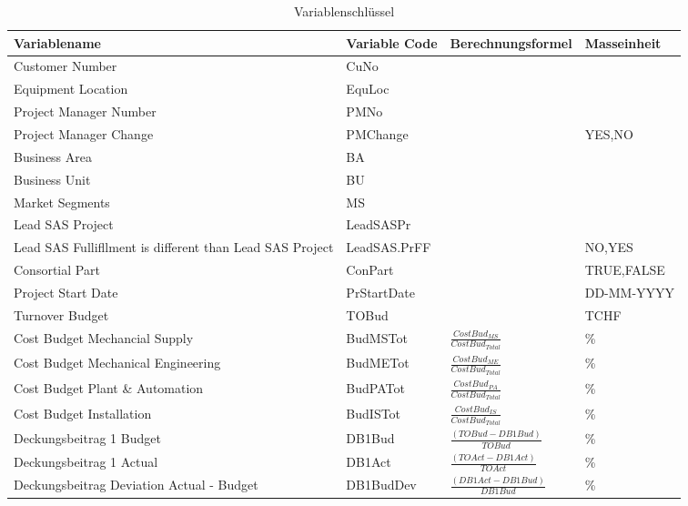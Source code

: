 \newpage\begin{landscape}
\begin{center}
\begin{longtable}{p{6cm}|p{4cm}|p{6cm}|p{3cm}}
	\caption{Variablenschlüssel}\\\hline
	\textbf{Variablename} & \textbf{Variable Code} & {\textbf{Berechnungsformel}} & {\textbf{Masseinheit}} \\\hline\endhead
		Customer Number & CuNo  &       &  \\
		Equipment Location & EquLoc &       &  \\
		Project Manager Number & PMNo  &       &  \\
		Project Manager Change & PMChange &       & \multicolumn{1}{l}{{YES,NO}} \\
		Business Area & BA    &       &  \\
		Business Unit & BU    &       &  \\
		Market Segments & MS    &       &  \\
		Lead SAS Project & LeadSASPr &       &  \\
		Lead SAS Fullifllment is different than Lead SAS Project & LeadSAS.PrFF &       & \multicolumn{1}{l}{{NO,YES}} \\
		Consortial Part & ConPart &       & \multicolumn{1}{l}{{TRUE,FALSE}} \\
		Project Start Date & PrStartDate &       & \multicolumn{1}{l}{DD-MM-YYYY} \\
		Turnover Budget & TOBud &       & \multicolumn{1}{l}{TCHF} \\
		Cost Budget Mechancial Supply & BudMSTot & $\frac{Cost Bud_{MS}}{Cost Bud_{Total}}$ & \multicolumn{1}{l}{\%} \\ [3mm]
		Cost Budget Mechanical Engineering & BudMETot & $\frac{Cost Bud_{ME}}{Cost Bud_{Total}}$ & \multicolumn{1}{l}{\%} \\ [3mm]
		Cost Budget Plant \& Automation & BudPATot & $\frac{Cost Bud_{PA}}{Cost Bud_{Total}}$ & \multicolumn{1}{l}{\%} \\ [3mm]
		Cost Budget Installation  & BudISTot & $\frac{Cost Bud_{IS}}{Cost Bud_{Total}}$ & \multicolumn{1}{l}{\%} \\ [3mm]
		Deckungsbeitrag 1 Budget & DB1Bud &  $\frac{(TOBud - DB1Bud)}{TOBud}$ & \multicolumn{1}{l}{\%} \\ [3mm]
		Deckungsbeitrag 1 Actual & DB1Act & $\frac{(TOAct - DB1Act)}{TOAct}$ & \multicolumn{1}{l}{\%} \\ [3mm]
		Deckungsbeitrag Deviation Actual - Budget & DB1BudDev &  $\frac{(DB1 Act-DB1 Bud)}{DB1 Bud}$     & \multicolumn{1}{l}{\%} \\ [3mm]

\end{longtable}
\end{center}
\end{landscape}
